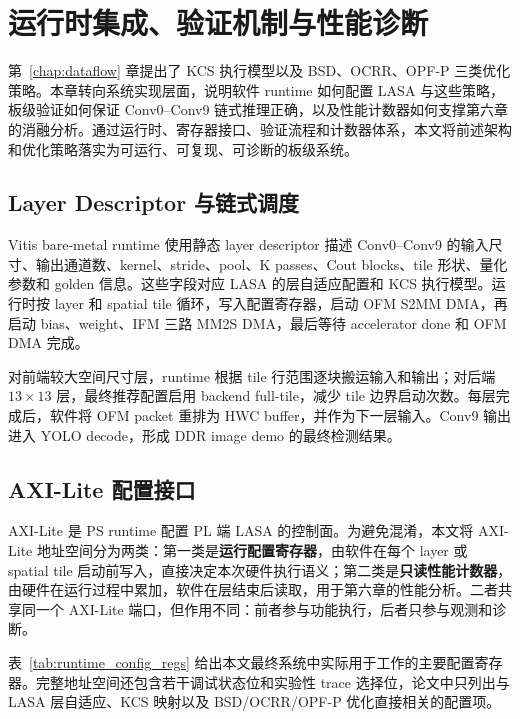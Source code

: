 \chapter{运行时集成、验证机制与性能诊断}
\label{chap:runtime}

第~\ref{chap:dataflow} 章提出了 KCS 执行模型以及 BSD、OCRR、OPF-P 三类优化策略。本章转向系统实现层面，说明软件 runtime 如何配置 LASA 与这些策略，板级验证如何保证 Conv0--Conv9 链式推理正确，以及性能计数器如何支撑第六章的消融分析。通过运行时、寄存器接口、验证流程和计数器体系，本文将前述架构和优化策略落实为可运行、可复现、可诊断的板级系统。

\section{Layer Descriptor 与链式调度}

Vitis bare-metal runtime 使用静态 layer descriptor 描述 Conv0--Conv9 的输入尺寸、输出通道数、kernel、stride、pool、K passes、Cout blocks、tile 形状、量化参数和 golden 信息。这些字段对应 LASA 的层自适应配置和 KCS 执行模型。运行时按 layer 和 spatial tile 循环，写入配置寄存器，启动 OFM S2MM DMA，再启动 bias、weight、IFM 三路 MM2S DMA，最后等待 accelerator done 和 OFM DMA 完成。

对前端较大空间尺寸层，runtime 根据 tile 行范围逐块搬运输入和输出；对后端 $13\times13$ 层，最终推荐配置启用 backend full-tile，减少 tile 边界启动次数。每层完成后，软件将 OFM packet 重排为 HWC buffer，并作为下一层输入。Conv9 输出进入 YOLO decode，形成 DDR image demo 的最终检测结果。

\section{AXI-Lite 配置接口}

AXI-Lite 是 PS runtime 配置 PL 端 LASA 的控制面。为避免混淆，本文将 AXI-Lite 地址空间分为两类：第一类是\textbf{运行配置寄存器}，由软件在每个 layer 或 spatial tile 启动前写入，直接决定本次硬件执行语义；第二类是\textbf{只读性能计数器}，由硬件在运行过程中累加，软件在层结束后读取，用于第六章的性能分析。二者共享同一个 AXI-Lite 端口，但作用不同：前者参与功能执行，后者只参与观测和诊断。

表~\ref{tab:runtime_config_regs} 给出本文最终系统中实际用于工作的主要配置寄存器。完整地址空间还包含若干调试状态位和实验性 trace 选择位，论文中只列出与 LASA 层自适应、KCS 映射以及 BSD/OCRR/OPF-P 优化直接相关的配置项。

